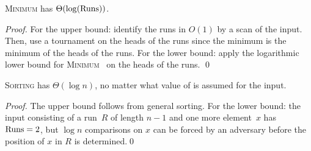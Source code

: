 \begin{theorem}
\textsc{Minimum} has \frag $\Theta(\log (\mathrm{Runs}))$.
\end{theorem}
\begin{proof}
For the upper bound: identify the runs in $O(1)$ \frag by a scan of the input. Then, use a
tournament on the heads of the runs since the minimum is the minimum of the heads of the runs. 
For the lower bound: apply the logarithmic lower
bound for \textsc{Minimum}~\cite{afshani:fragile-ESA19} on the heads
of the runs. \qed
\end{proof}

\begin{theorem}
\textsc{Sorting} has \frag $\Theta(\log n)$, no matter what value of
\RUNS{} is assumed for the input.
\end{theorem}
\begin{proof}
The upper bound follows from general sorting. For the lower bound: the input
consisting of a run~$R$ of length $n-1$ and one more element~$x$ has
$\mathrm{Runs} = 2$, but $\log n$ comparisons on $x$ can be forced by an
adversary before the position of $x$ in $R$ is determined.\qed
\end{proof}

